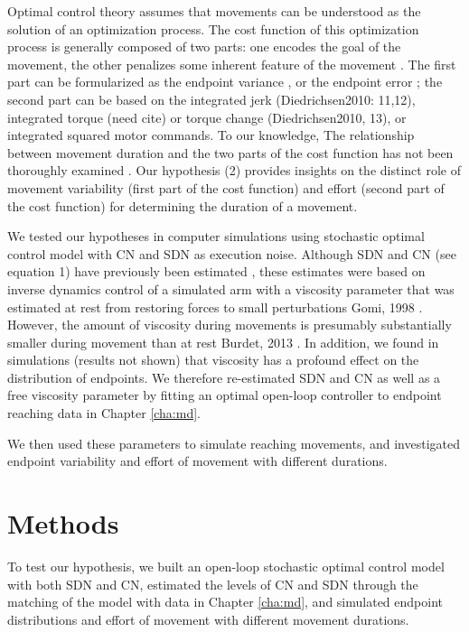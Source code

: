 Optimal control theory assumes that movements can be understood as the solution of an optimization process.
The cost function of this optimization process is generally composed of two parts: one encodes the goal of the movement, the other penalizes some inherent feature of the movement \cite{Diedrichsen2010}. 
The first part can be formularized as the endpoint variance \cite{Harris1998}, or the endpoint error \cite{Todorov}; 
the second part can be based on the integrated jerk (Diedrichsen2010: 11,12), integrated torque (need cite) or torque change (Diedrichsen2010, 13), or integrated squared motor commands\cite{Todorov}. 
To our knowledge, The relationship between movement duration and the two parts of the cost function has not been thoroughly examined \cite{}. 
Our hypothesis (2) provides insights on the distinct role of movement variability (first part of the cost function) and effort (second part of the cost function) for determining the duration of a movement.

We tested our hypotheses in computer simulations using stochastic optimal control \cite{Todorov} model with CN and SDN as execution noise.  
Although SDN and CN (see equation 1) have previously been estimated \cite{VanBeers2004}, these estimates were based on inverse dynamics control of a simulated arm with a viscosity parameter that was estimated at rest from restoring forces to small perturbations {Gomi, 1998 }. 
However, the amount of viscosity during movements is presumably substantially smaller during movement than at rest {Burdet, 2013 }. 
In addition, we found in simulations (results not shown) that viscosity has a profound effect on the distribution of endpoints.  
We therefore re-estimated SDN and CN as well as a free viscosity parameter by fitting an optimal open-loop controller to endpoint reaching data in Chapter \ref{cha:md}.

We then used these parameters to simulate reaching movements, and investigated endpoint variability and effort of movement with different durations.

\section{Methods}
To test our hypothesis, we built an open-loop stochastic optimal control model with both SDN and CN, estimated the levels of CN and SDN through the matching of the model with data in Chapter \ref{cha:md}, and simulated endpoint distributions and effort of movement with different movement durations.

